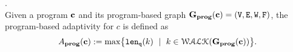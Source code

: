 \documentclass[a4paper,11pt]{article}
\begin{document}
\begin{defn}
.
\label{def:prog_adapt}
\\
{
Given a program $\boldsymbol{\mathbf{c}}$ and its program-based graph 
$\mathtt{\bf{G_{prog}}}(\boldsymbol{\mathbf{c}}) = (\mathtt{V}, \mathtt{E}, \mathtt{W}, \mathtt{F})$,
%
the program-based adaptivity for $c$ is defined as%
\[
\progA(\ssa{c}) 
:= \max
\left\{ \qlen(k)\ \mid \  k\in \walk(\progG(\ssa{c}))\right \}.
\]
}
%
\end{defn}  
%
%
%
\end{document}
